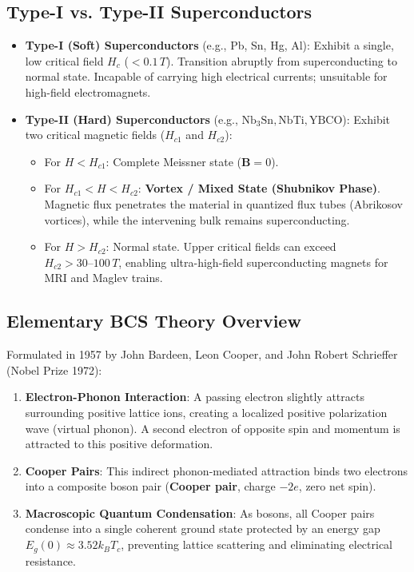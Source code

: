 \subsection{Type-I vs. Type-II Superconductors}
\begin{itemize}
    \item \textbf{Type-I (Soft) Superconductors} (e.g., Pb, Sn, Hg, Al): Exhibit a single, low critical field $H_c$ ($<0.1\,\si{T}$). Transition abruptly from superconducting to normal state. Incapable of carrying high electrical currents; unsuitable for high-field electromagnets.
    \item \textbf{Type-II (Hard) Superconductors} (e.g., $\text{Nb}_3\text{Sn}, \text{NbTi}, \text{YBCO}$): Exhibit two critical magnetic fields ($H_{c1}$ and $H_{c2}$):
    \begin{itemize}
        \item For $H < H_{c1}$: Complete Meissner state ($\mathbf{B}=0$).
        \item For $H_{c1} < H < H_{c2}$: \textbf{Vortex / Mixed State (Shubnikov Phase)}. Magnetic flux penetrates the material in quantized flux tubes (Abrikosov vortices), while the intervening bulk remains superconducting.
        \item For $H > H_{c2}$: Normal state. Upper critical fields can exceed $H_{c2} > 30\text{--}100\,\si{T}$, enabling ultra-high-field superconducting magnets for MRI and Maglev trains.
    \end{itemize}
\end{itemize}

\subsection{Elementary BCS Theory Overview}
Formulated in 1957 by John Bardeen, Leon Cooper, and John Robert Schrieffer (Nobel Prize 1972):
\begin{enumerate}
    \item \textbf{Electron-Phonon Interaction}: A passing electron slightly attracts surrounding positive lattice ions, creating a localized positive polarization wave (virtual phonon). A second electron of opposite spin and momentum is attracted to this positive deformation.
    \item \textbf{Cooper Pairs}: This indirect phonon-mediated attraction binds two electrons into a composite boson pair (\textbf{Cooper pair}, charge $-2e$, zero net spin).
    \item \textbf{Macroscopic Quantum Condensation}: As bosons, all Cooper pairs condense into a single coherent ground state protected by an energy gap $E_g(0) \approx 3.52 k_B T_c$, preventing lattice scattering and eliminating electrical resistance.
\end{enumerate}

